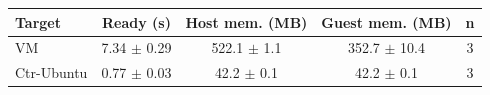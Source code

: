 \begin{tabular}{|l|c|c|c|c|}
\hline
\textbf{Target} & \textbf{Ready (s)} & \textbf{Host mem. (MB)} & \textbf{Guest mem. (MB)} & \textbf{n} \\
\hline
VM & 7.34 $\pm$ 0.29 & 522.1 $\pm$ 1.1 & 352.7 $\pm$ 10.4 & 3 \\
\hline
Ctr-Ubuntu & 0.77 $\pm$ 0.03 & 42.2 $\pm$ 0.1 & 42.2 $\pm$ 0.1 & 3 \\
\hline
\end{tabular}
